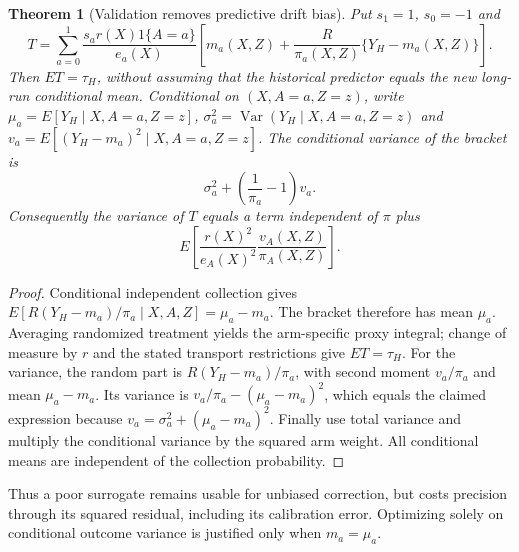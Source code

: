\documentclass[11pt]{article}
\newtheorem{theorem}{Theorem}
\theoremstyle{remark}
\begin{document}
\begin{theorem}[Validation removes predictive drift bias]
Put $s_1=1$, $s_0=-1$ and
\[
 T=\sum_{a=0}^1\frac{s_a r(X)1\{A=a\}}{e_a(X)}
 \left[m_a(X,Z)+\frac R{\pi_a(X,Z)}\{Y_H-m_a(X,Z)\}\right].
\]
Then $ET=\tau_H$, without assuming that the historical predictor equals the new long-run conditional mean. Conditional on $(X,A=a,Z=z)$, write $\mu_a=E[Y_H\mid X,A=a,Z=z]$, $\sigma_a^2=\operatorname{Var}(Y_H\mid X,A=a,Z=z)$ and
$v_a=E[(Y_H-m_a)^2\mid X,A=a,Z=z]$. The conditional variance of the bracket is
\[
 \sigma_a^2+\left(\frac1{\pi_a}-1\right)v_a.
\]
Consequently the variance of $T$ equals a term independent of $\pi$ plus
\[
 E\left[\frac{r(X)^2}{e_A(X)^2}\frac{v_A(X,Z)}{\pi_A(X,Z)}\right].
\]
\end{theorem}
\begin{proof}
Conditional independent collection gives $E[R(Y_H-m_a)/\pi_a\mid X,A,Z]=\mu_a-m_a$. The bracket therefore has mean $\mu_a$. Averaging randomized treatment yields the arm-specific proxy integral; change of measure by $r$ and the stated transport restrictions give $ET=\tau_H$.
For the variance, the random part is $R(Y_H-m_a)/\pi_a$, with second moment $v_a/\pi_a$ and mean $\mu_a-m_a$. Its variance is $v_a/\pi_a-(\mu_a-m_a)^2$, which equals the claimed expression because $v_a=\sigma_a^2+(\mu_a-m_a)^2$. Finally use total variance and multiply the conditional variance by the squared arm weight. All conditional means are independent of the collection probability.
\end{proof}
Thus a poor surrogate remains usable for unbiased correction, but costs precision through its squared residual, including its calibration error. Optimizing solely on conditional outcome variance is justified only when $m_a=\mu_a$.
\end{document}

